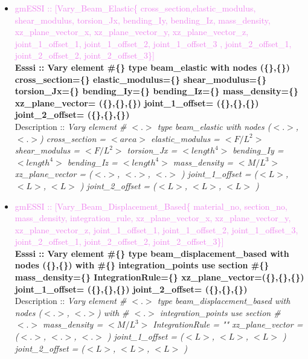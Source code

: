 \documentclass[11pt]{article}
\begin{document}
\begin{itemize}
  \item \textcolor{violet}{gmESSI :: [Vary\_Beam\_Elastic\{ cross\_section,elastic\_modulus, shear\_modulus, torsion\_Jx, bending\_Iy, bending\_Iz, mass\_density, xz\_plane\_vector\_x, xz\_plane\_vector\_y, xz\_plane\_vector\_z, joint\_1\_offset\_1, joint\_1\_offset\_2, joint\_1\_offset\_3 , joint\_2\_offset\_1, joint\_2\_offset\_2, joint\_2\_offset\_3\}]} \\          
  \textbf{Esssi :: Vary element \#\{\} type beam\_elastic with nodes (\{\},\{\}) cross\_section=\{\} elastic\_modulus=\{\} shear\_modulus=\{\} torsion\_Jx=\{\} bending\_Iy=\{\} bending\_Iz=\{\} mass\_density=\{\}  xz\_plane\_vector= (\{\},\{\},\{\}) joint\_1\_offset= (\{\},\{\},\{\}) joint\_2\_offset= (\{\},\{\},\{\})}\\
  Description :: \textit{ Vary element \# $<.>$ type beam\_elastic with nodes ($<.>$, $<.>$) cross\_section = $<area>$ elastic\_modulus = $<F/L^2>$ shear\_modulus = $<F/L^2>$ torsion\_Jx = $<length^4>$ bending\_Iy = $<length^4>$ bending\_Iz = $<length^4>$ mass\_density = $<M/L^3>$  xz\_plane\_vector = ($<.>$, $<.>$, $<.>$ ) joint\_1\_offset = ($<L>$, $<L>$, $<L>$ ) joint\_2\_offset = ($<L>$, $<L>$, $<L>$ )}

  \item \textcolor{violet}{gmESSI :: [Vary\_Beam\_Displacement\_Based\{ material\_no, section\_no, mass\_density, integration\_rule, xz\_plane\_vector\_x, xz\_plane\_vector\_y, xz\_plane\_vector\_z, joint\_1\_offset\_1, joint\_1\_offset\_2, joint\_1\_offset\_3, joint\_2\_offset\_1, joint\_2\_offset\_2, joint\_2\_offset\_3\}]} \\
  \textbf{Esssi :: Vary element \#\{\} type beam\_displacement\_based with nodes (\{\},\{\}) with \#\{\}  integration\_points use section \#\{\} mass\_density=\{\} IntegrationRule=\{\}  xz\_plane\_vector=(\{\},\{\},\{\}) joint\_1\_offset= (\{\},\{\},\{\}) joint\_2\_offset= (\{\},\{\},\{\})}\\
  Description :: \textit{ Vary element \# $<.>$ type beam\_displacement\_based with nodes ($<.>$, $<.>$) with \# $<.>$ integration\_points use section \# $<.>$ mass_density = $<M/L^3>$ IntegrationRule = ""  xz\_plane\_vector = ($<.>$, $<.>$, $<.>$ ) joint\_1\_offset = ($<L>$, $<L>$, $<L>$ ) joint\_2\_offset = ($<L>$, $<L>$, $<L>$ )}


\end{itemize}
\end{document}
